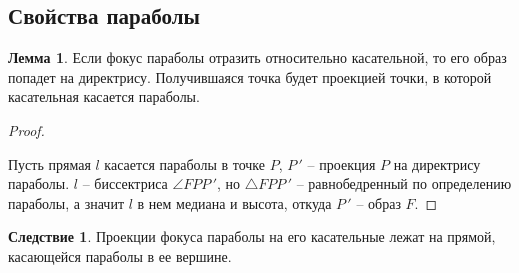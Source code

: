 \documentclass[12pt]{article}
\theoremstyle{definition}
\newtheorem{lemma}[theorem]{Лемма}
\newtheorem{consequence}{Следствие}[subsection]
\begin{document}
\subsection{Свойства параболы}
    \begin{lemma}
        Если фокус параболы отразить относительно касательной, то его образ попадет на директрису. Получившаяся точка будет проекцией точки, в которой касательная касается параболы.
    \end{lemma}
    \begin{proof}
    $ $\par\nobreak\ignorespaces
    \begin{center}
    \end{center}
        Пусть прямая $l$ касается параболы в точке $P$, $P\,'$ -- проекция $P$ на директрису параболы. $l$ -- биссектриса $\angle FPP\,'$, но $\triangle FPP\,'$ -- равнобедренный по определению параболы, а значит $l$ в нем медиана и высота, откуда $P\,'$ -- образ $F$.
    \end{proof}
    \setcounter{subsection}{7}
    \begin{consequence}
        Проекции фокуса параболы на его касательные лежат на прямой, касающейся параболы в ее вершине.
    \end{consequence}
\end{document}
